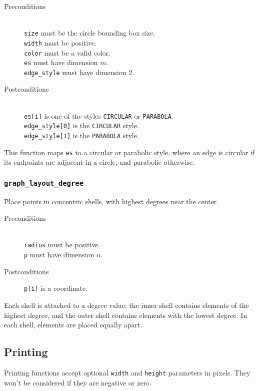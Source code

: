 \begin{description}
 \item[Preconditions]~\\
   \texttt{size} must be the circle bounding box size.\\
   \texttt{width} must be positive.\\
   \texttt{color} must be a valid color.\\
   \texttt{es} must have dimension $m$.\\
   \texttt{edge\_style} must have dimension 2.
 \item[Postconditions]~\\
   \texttt{es[i]} is one of the styles \texttt{CIRCULAR} or \texttt{PARABOLA}.\\
   \texttt{edge\_style[0]} is the \texttt{CIRCULAR} style.\\
   \texttt{edge\_style[1]} is the \texttt{PARABOLA} style.\\
\end{description}

This function maps \texttt{es} to a circular or parabolic style, where
an edge is circular if its endpoints are adjacent in a circle, and 
parabolic otherwise.

\subsubsection{\texttt{graph\_layout\_degree}}

Place points in concentric shells, with highest degrees near the center.

\begin{description}
 \item[Preconditions]~\\
   \texttt{radius} must be positive.\\
   \texttt{p} must have dimension $n$.
 \item[Postconditions] \texttt{p[i]} is a coordinate.
\end{description}

Each shell is attached to a degree value; the inner shell contains elements
of the highest degree, and the outer shell contains elements with the lowest
degree. In each shell, elements are placed equally apart.

\subsection{Printing}

Printing functions accept optional \texttt{width} and \texttt{height} parameters
in pixels. They won't be considered if they are negative or zero.


